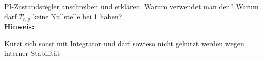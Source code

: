 \begin{question}[section=8,name={PI-Zustandsregler 2},difficulty=,type=mdl,tags={}]
	PI-Zustandsregler anschreiben und erklären. Warum verwendet man den? Warum darf $T_{r,y}$ keine Nullstelle bei 1 haben? 
	\\ \textbf{Hinweis:}\\
	
\end{question}
\begin{solution}
	Kürzt sich sonst mit Integrator und darf sowieso nicht gekürzt werden wegen interner Stabilität
\end{solution}
